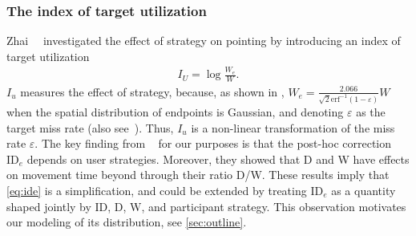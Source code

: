 \documentclass[acmlarge, manuscript,review]{acmart}
\newcommand{\ide}{\ensuremath{{\text{ID}_e}}\xspace}
\begin{document}
\subsubsection{The index of target utilization\label{subs:background::target_util}}
Zhai~\etal~\cite{zhai2004nominal} investigated the effect of strategy on pointing by introducing an index of target utilization
\begin{align}
  I_U = \log \frac{W_e}{W}.
\end{align}
$I_u$ measures the effect of strategy, because, as shown in \cite[Appendix 3]{gori2018tochi}, $W_e = \frac{2.066}{\sqrt{2}\text{erf}^{-1}(1-\varepsilon)} W$ when the spatial distribution of endpoints is Gaussian, and denoting $\varepsilon$ as the target miss rate (also see~\cite{soukoreff2004, gori2020}). Thus, $I_u$ is a non-linear transformation of the miss rate $\varepsilon$.
The key finding from \citeauthor{zhai2004nominal}~\cite{zhai2004nominal} for our purposes is that the post-hoc correction \ide depends on user strategies. Moreover, they showed that D and W have effects on movement time beyond through their ratio D/W. These results imply that \autoref{eq:ide} is a simplification, and could be extended by treating \ide as a quantity shaped jointly by ID, D, W, and participant strategy. This observation motivates our modeling of its distribution, see \autoref{sec:outline}.
\end{document}
